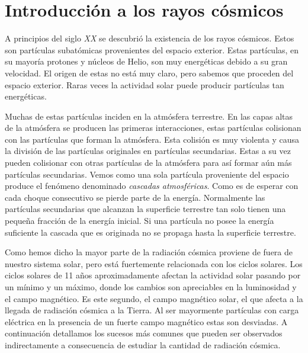\section{Introducción a los rayos cósmicos}
	A principios del siglo \emph{XX} se descubrió la existencia de los rayos cósmicos. Estos son partículas subatómicas provenientes del espacio
	exterior. Estas partículas, en su mayoría protones y núcleos de Helio, son muy energéticas debido a su gran velocidad. El origen de estas no
	está muy claro, pero sabemos que proceden del espacio exterior. Raras veces la actividad solar puede producir partículas tan energéticas. 
	\par
	Muchas de estas partículas inciden en la atmósfera terrestre. En las capas altas de la atmósfera se producen las primeras interacciones, estas
	partículas colisionan con las partículas que forman la atmósfera. Esta colisión es muy violenta y causa la división de las partículas
	originales en partículas secundarias. Estas a su vez pueden colisionar con otras partículas de la atmósfera para así formar aún más partículas
	secundarias. Vemos como una sola partícula proveniente del espacio produce el fenómeno denominado \emph{cascadas atmosféricas}. Como es de
	esperar con cada choque consecutivo se pierde parte de la energía. Normalmente las partículas secundarias que alcanzan la superficie terrestre
	tan solo tienen una pequeña fracción de la energía inicial. Si una partícula no posee la energía suficiente la cascada que es originada no se
	propaga hasta la superficie terrestre.
	\par
	Como hemos dicho la mayor parte de la radiación cósmica proviene de fuera de nuestro sistema solar, pero está fuertemente relacionada con los
	ciclos solares. Los ciclos solares de 11 años aproximadamente afectan la actividad solar pasando por un mínimo y un máximo, donde los cambios
	son apreciables en la luminosidad y el campo magnético. Es este segundo, el campo magnético solar, el que afecta a la llegada de radiación
	cósmica a la Tierra. Al ser mayormente partículas con carga eléctrica en la presencia de un fuerte campo magnético estas son desviadas. A
	continuación detallamos los sucesos más comunes que pueden ser observados indirectamente a consecuencia de estudiar la cantidad de radiación
	cósmica.
